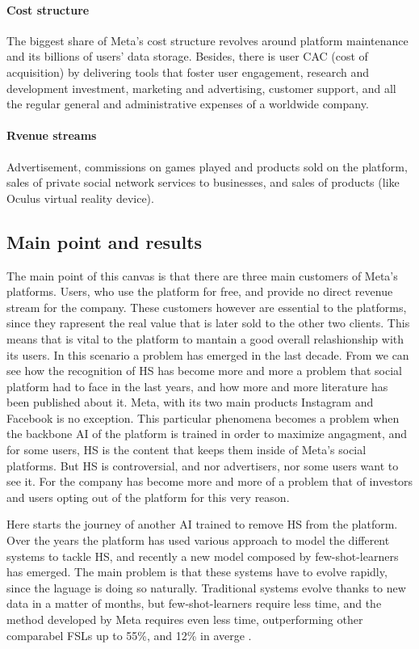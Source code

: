 \paragraph{Cost structure}
The biggest share of Meta's cost structure revolves around platform
maintenance and its billions of users' data storage. Besides, there is
user CAC (cost of acquisition) by delivering tools that foster user
engagement, research and development investment, marketing and
advertising, customer support, and all the regular general and
administrative expenses of a worldwide company.

\paragraph{Rvenue streams}
Advertisement, commissions on games played and products sold on the
platform, sales of private social network services to businesses, and
sales of products (like Oculus virtual reality device).

\subsection{Main point and results}
The main point of this canvas is that there are three main customers
of Meta's platforms. Users, who use the platform for free, and provide
no direct revenue stream for the company. These customers however are
essential to the platforms, since they rapresent the real value that
is later sold to the other two clients. This means that is vital to
the platform to mantain a good overall relashionship with its
users. In this scenario a problem has emerged in the last decade. From
\cite{art:fortuna2018survey} we can see how the recognition of HS has
become more and more a problem that social platform had to face in the
last years, and how more and more literature has been published about
it. Meta, with its two main products Instagram and Facebook is no
exception. This particular phenomena becomes a problem when the
backbone AI of the platform is trained in order to maximize angagment,
and for some users, HS is the content that keeps them inside
of Meta's social platforms. But HS is controversial, and nor
advertisers, nor some users want to see it. For the company has become
more and more of a problem that of investors and users opting out of
the platform for this very reason.

Here starts the journey of another AI trained to remove HS
from the platform. Over the years the platform has used various
approach to model the different systems to tackle HS, and
recently a new model composed by few-shot-learners has emerged. The
main problem is that these systems have to evolve rapidly, since the
laguage is doing so naturally. Traditional systems evolve thanks to
new data in a matter of months, but few-shot-learners require less
time, and the method developed by Meta requires even less time,
outperforming other comparabel FSLs up to 55\%, and 12\% in averge
\cite[pp.~5-8]{art:entailing}.

